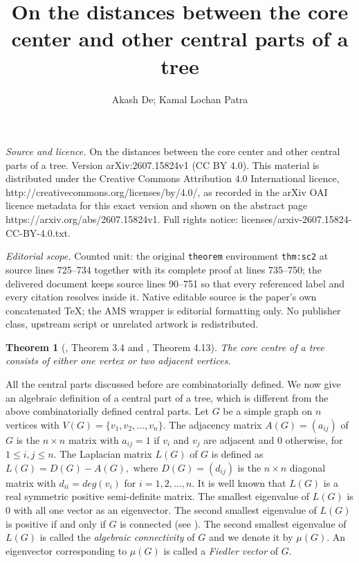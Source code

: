 \documentclass[10pt,a4paper]{amsart}
\newtheorem{theorem}{Theorem}[section]
\begin{document}
\title[On the distances between the core center and other central p]{On the distances between the core center and other central parts of a tree}
\author{Akash De; Kamal Lochan Patra}
\date{}
\maketitle
\noindent\emph{Source and licence.} On the distances between the core center and other central parts of a tree. Version arXiv:2607.15824v1 (CC BY 4.0). This material is distributed under the Creative Commons Attribution 4.0 International licence, http://creativecommons.org/licenses/by/4.0/, as recorded in the arXiv OAI licence metadata for this exact version and shown on the abstract page https://arxiv.org/abs/2607.15824v1. Full rights notice: licenses/arxiv-2607.15824-CC-BY-4.0.txt.\par\smallskip
\noindent\textit{Editorial scope.} Counted unit: the original \texttt{theorem} environment \texttt{thm:sc2} at source lines 725--734 together with its complete proof at lines 735--750; the delivered document keeps source lines 90--751 so that every referenced label and every citation resolves inside it. Native editable source is the paper's own concatenated TeX; the AMS wrapper is editorial formatting only. No publisher class, upstream script or unrelated artwork is redistributed.
\begin{theorem}[\cite{Zhang}, Theorem 3.4 and \cite{Pandey3}, Theorem 4.13]\label{zha}
The core centre of a tree consists of either one vertex or two adjacent vertices.
\end{theorem}

All the central parts discussed before are combinatorially defined. We now give an algebraic definition of a central part of a tree, which is different from  the  above combinatorially defined central parts. Let $G$ be a simple graph on $n$ vertices with $V(G)=\{v_1,v_2,\ldots,v_n\}$.  The adjacency matrix $A(G)=(a_{ij})$ of $G$ is the $n\times n$ matrix with $a_{ij}=1$ if $v_i$ and $v_j$ are adjacent and $0$ otherwise, for $1\leq i,j \leq n$. The Laplacian matrix $L(G)$ of $G$ is defined as $L(G)=D(G)-A(G),$ where $D(G)=(d_{ij})$  is the $n\times n$ diagonal matrix with $d_{ii}=deg(v_i)$ for $i=1,2,\ldots,n$. It is well known that $L(G)$ is a real symmetric positive semi-definite  matrix. The smallest eigenvalue of $L(G)$ is $0$ with all one vector as an eigenvector. The second smallest eigenvalue of $L(G)$  is positive if and only if $G$ is connected (see \cite{Fie1}). The second smallest eigenvalue of $L(G)$ is called the {\it algebraic connectivity} of $G$ and we  denote it by $\mu(G)$. An eigenvector corresponding to $\mu(G)$ is called a {\it Fiedler vector} of $G.$
\end{document}
